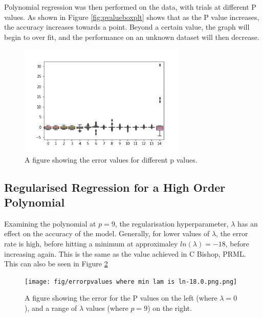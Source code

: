 \documentclass[a4paper, 11pt]{article}
\begin{document}
Polynomial regression was then performed on the data, with trials at different P values. As shown in Figure \ref{fig:pvalueboxplt} shows that as the P value increases, the accuracy increases towards a point. Beyond a certain value, the graph will begin to over fit, and the performance on an unknown dataset will then decrease.

\begin{figure}[h]
    \begin{center}
    \includegraphics[width=8cm]{fig/pvalueboxplot.png}
    \caption{A figure showing the error values for different p values.}
    \label{fig:traintestsplit}     
\end{center}
\end{figure}

\subsection{Regularised Regression for a High Order Polynomial}
\label{sec:changinglamda}

Examining the polynomial at $p=9$, the regularisation hyperparameter, $\lambda$ has an effect on the accuracy of the model. Generally, for lower values of $\lambda$, the error rate is high, before hitting a minimum at approximaley $ln(\lambda) = -18$, before increasing again. This is the same as the value achieved in C Bishop, PRML. This can also be seen in Figure \ref{fig:pandlamchange}
\begin{figure}[h]
    \begin{center}
    \texttt{[image: fig/errorpvalues where min lam is ln-18.0.png.png]}
    \caption{A figure showing the error for the P values on the left (where $\lambda=0$), and a range of $\lambda$ values (where $p=9$) on the right.}
    \label{fig:pandlamchange}     
\end{center}
\end{figure}
\end{document}
